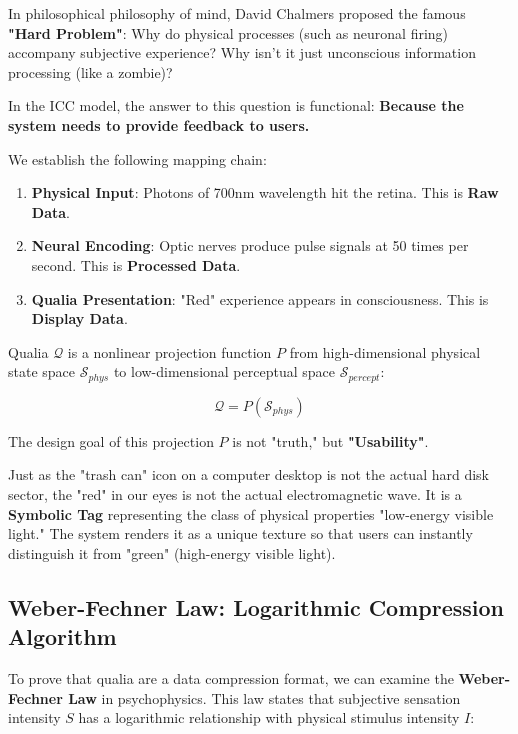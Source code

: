 In philosophical philosophy of mind, David Chalmers proposed the famous \textbf{"Hard Problem"}: Why do physical processes (such as neuronal firing) accompany subjective experience? Why isn't it just unconscious information processing (like a zombie)?

In the ICC model, the answer to this question is functional: \textbf{Because the system needs to provide feedback to users.}

We establish the following mapping chain:

\begin{enumerate}
\item \textbf{Physical Input}: Photons of 700nm wavelength hit the retina. This is \textbf{Raw Data}.

\item \textbf{Neural Encoding}: Optic nerves produce pulse signals at 50 times per second. This is \textbf{Processed Data}.

\item \textbf{Qualia Presentation}: "Red" experience appears in consciousness. This is \textbf{Display Data}.
\end{enumerate}

\begin{definition}
Qualia $\mathcal{Q}$ is a nonlinear projection function $P$ from high-dimensional physical state space $\mathcal{S}_{phys}$ to low-dimensional perceptual space $\mathcal{S}_{percept}$:

\begin{equation}
\mathcal{Q} = P(\mathcal{S}_{phys})
\end{equation}

The design goal of this projection $P$ is not "truth," but \textbf{"Usability"}.
\end{definition}

Just as the "trash can" icon on a computer desktop is not the actual hard disk sector, the "red" in our eyes is not the actual electromagnetic wave. It is a \textbf{Symbolic Tag} representing the class of physical properties "low-energy visible light." The system renders it as a unique texture so that users can instantly distinguish it from "green" (high-energy visible light).

\subsection{Weber-Fechner Law: Logarithmic Compression Algorithm}

To prove that qualia are a data compression format, we can examine the \textbf{Weber-Fechner Law} in psychophysics. This law states that subjective sensation intensity $S$ has a logarithmic relationship with physical stimulus intensity $I$:

